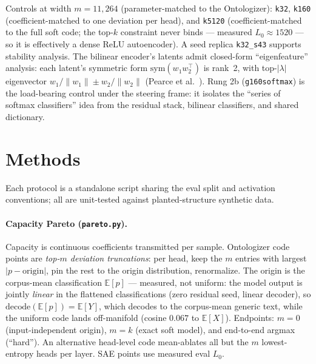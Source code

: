\documentclass[11pt]{article}
\begin{document}
Controls at width $m{=}11{,}264$ (parameter-matched to the Ontologizer):
\texttt{k32}, \texttt{k160} (coefficient-matched to one deviation per
head), and \texttt{k5120} (coefficient-matched to the full soft code; the
top-$k$ constraint never binds --- measured $L_0 \approx 1520$ --- so it is
effectively a dense ReLU autoencoder). A seed replica \texttt{k32\_s43}
supports stability analysis. The bilinear encoder's latents admit
closed-form ``eigenfeature'' analysis: each latent's symmetric form
$\mathrm{sym}(w_1 w_2^\top)$ is rank~2, with top-$|\lambda|$ eigenvector
$w_1/\|w_1\| \pm w_2/\|w_2\|$ (Pearce et al.~\cite{pearce2025}). Rung 2b
(\texttt{g160softmax}) is the load-bearing control under the steering
frame: it isolates the ``series of softmax classifiers'' idea from the
residual stack, bilinear classifiers, and shared dictionary.

\section{Methods}

Each protocol is a standalone script sharing the eval split and activation
conventions; all are unit-tested against planted-structure synthetic data.

\paragraph{Capacity Pareto (\texttt{pareto.py}).}
Capacity is continuous coefficients transmitted per sample. Ontologizer
code points are \emph{top-$m$ deviation truncations}: per head, keep the
$m$ entries with largest $|p - \mathrm{origin}|$, pin the rest to the
origin distribution, renormalize. The origin is the corpus-mean
classification $\mathbb{E}[p]$ --- measured, not uniform: the model output
is jointly \emph{linear} in the flattened classifications (zero residual
seed, linear decoder), so $\mathrm{decode}(\mathbb{E}[p]) =
\mathbb{E}[Y]$, which decodes to the corpus-mean generic text, while the
uniform code lands off-manifold (cosine $0.067$ to $\mathbb{E}[X]$).
Endpoints: $m{=}0$ (input-independent origin), $m{=}k$ (exact soft model),
and end-to-end argmax (``hard''). An alternative head-level code
mean-ablates all but the $m$ lowest-entropy heads per layer. SAE points
use measured eval $L_0$.
\end{document}
